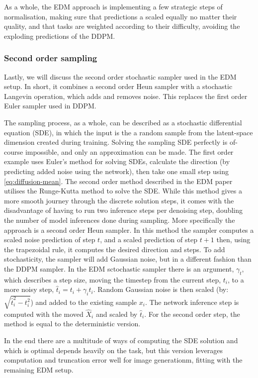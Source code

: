 As a whole, the EDM approach is implementing a few strategic steps of normalisation, making sure that predictions a scaled equally no matter their quality, and that tasks are weighted according to their difficulty, avoiding the exploding predictions of the DDPM.

\subsubsection{Second order sampling}

Lastly, we will discuss the second order stochastic sampler used in the EDM setup. In short, it combines a second order Heun sampler with a stochastic Langevin operation, which adds and removes noise. This replaces the first order Euler sampler used in DDPM. 

The sampling process, as a whole, can be described as a stochastic differential equation (SDE), in which the input is the a random sample from the latent-space dimension created during training. Solving the sampling SDE perfectly is of-course impossible, and only an approximation can be made. The first order example uses Euler's method for solving SDEs, calculate the direction (by predicting added noise using the network), then take one small step using \cref{eq:diffusion-mean}. The second order method described in the EDM paper utilises the Runge-Kutta method to solve the SDE. While this method gives a more smooth journey through the discrete solution steps, it comes with the disadvantage of having to run two inference steps per denoising step, doubling the number of model inferences done during sampling. More specifically the approach is a second order Heun sampler. In this method the sampler computes a scaled noise prediction of step $t$, and a scaled prediction of step $t+1$ then, using the trapezoidal rule, it computes the desired direction and steps. To add stochasticity, the sampler will add Gaussian noise, but in a different fashion than the DDPM sampler. In the EDM sctochastic sampler there is an argument, $\gamma_t$, which describes a step size, moving the timestep from the current step, $t_i$, to a more noisy step, $\hat{t}_i = t_i + \gamma_i t_i$. Random Gaussian noise is then scaled (by: $\sqrt{\hat{t}_i^2 - t_i^2}$) and added to the existing sample $x_i$. The network inference step is computed with the moved $\hat{X}_i$ and scaled by $\hat{t}_i$. For the second order step, the method is equal to the deterministic version.

In the end there are a multitude of ways of computing the SDE solution and which is optimal depends heavily on the task, but this version leverages computation and truncation error well for image generationm, fitting with the remaining EDM setup.